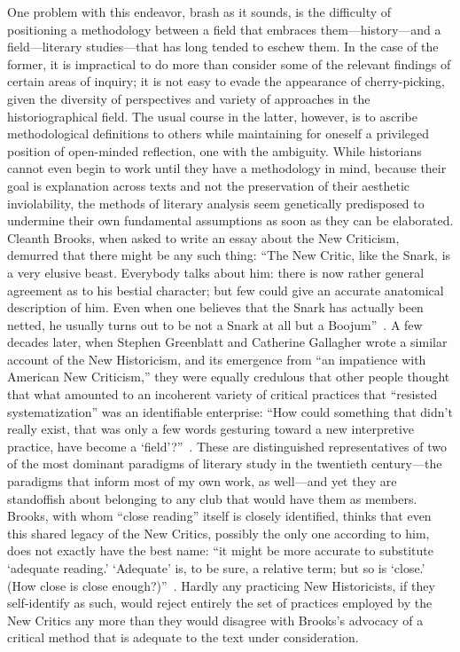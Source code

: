 One problem with this endeavor, brash as it sounds, is the difficulty of positioning a methodology between a field that embraces them---history---and a field---literary studies---that has long tended to eschew them. In the case of the former, it is impractical to do more than consider some of the relevant findings of certain areas of inquiry; it is not easy to evade the appearance of cherry-picking, given the diversity of perspectives and variety of approaches in the historiographical field. The usual course in the latter, however, is to ascribe methodological definitions to others while maintaining for oneself a privileged position of open-minded reflection, one with the ambiguity. While historians cannot even begin to work until they have a methodology in mind, because their goal is explanation across texts and not the preservation of their aesthetic inviolability, the methods of literary analysis seem genetically predisposed to undermine their own fundamental assumptions as soon as they can be elaborated. Cleanth Brooks, when asked to write an essay about the New Criticism, demurred that there might be any such thing: ``The New Critic, like the Snark, is a very elusive beast. Everybody talks about him: there is now rather general agreement as to his bestial character; but few could give an accurate anatomical description of him. Even when one believes that the Snark has actually been netted, he usually turns out to be not a Snark at all but a Boojum''~\cite[592]{Brooks}. A few decades later, when Stephen Greenblatt and Catherine Gallagher wrote a similar account of the New Historicism, and its emergence from ``an impatience with American New Criticism,'' they were equally credulous that other people thought that what amounted to an incoherent variety of critical practices that ``resisted systematization'' was an identifiable enterprise: ``How could something that didn't really exist, that was only a few words gesturing toward a new interpretive practice, have become a `field'?''~\cite[1--2]{Greenblatt/Gallagher}. These are distinguished representatives of two of the most dominant paradigms of literary study in the twentieth century---the paradigms that inform most of my own work, as well---and yet they are standoffish about belonging to any club that would have them as members. Brooks, with whom ``close reading'' itself is closely identified, thinks that even this shared legacy of the New Critics, possibly the only one according to him, does not exactly have the best name: ``it might be more accurate to substitute `adequate reading.' `Adequate' is, to be sure, a relative term; but so is `close.' (How close is close enough?)''~\cite[600]{Brooks}. Hardly any practicing New Historicists, if they self-identify as such, would reject entirely the set of practices employed by the New Critics any more than they would disagree with Brooks's advocacy of a critical method that is adequate to the text under consideration.

